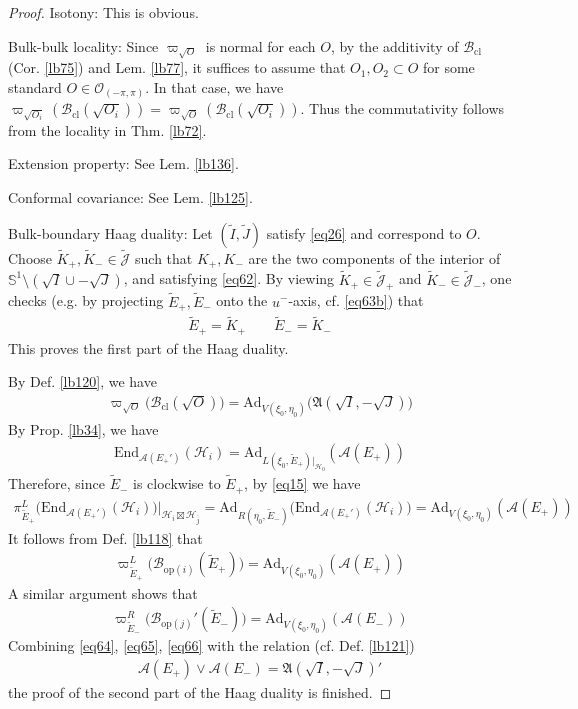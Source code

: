 \documentclass[11pt,b5paper,notitlepage]{article}
\theoremstyle{definition}
\theoremstyle{plain}
\newcommand{\fk}{\mathfrak}
\newcommand{\wtd}{\widetilde}
\newcommand{\ovl}{\overline}
\newcommand{\End}{\mathrm{End}} %
\newcommand{\Jtd}{\widetilde{\mathcal J}}
\newcommand{\Ad}{\mathrm{Ad}}
\newcommand{\Sbb}{{\mathbb S}}
\newcommand{\MA}{\mathcal A}
\newcommand{\MH}{\mathcal H}
\newcommand{\Bcl}{\mathcal B_{\mathrm{cl}}}
\newcommand{\Opp}{\mathcal O_{(-\pi,\pi)}}
\newcommand{\Bopi}{\mathcal B_{\mathrm{op}(i)}}
\newcommand{\Bopj}{\mathcal B_{\mathrm{op}(j)}}
\numberwithin{equation}{section}
\begin{document}
\begin{proof}
Isotony: This is obvious.

Bulk-bulk locality: Since $\varpi_{\sqrt O}$ is normal for each $O$, by the additivity of $\Bcl$ (Cor. \ref{lb75}) and Lem. \ref{lb77}, it suffices to assume that $O_1,O_2\subset O$ for some standard $O\in\Opp$. In that case, we have $\varpi_{\sqrt{O_i}}(\Bcl(\sqrt{O_i}))=\varpi_{\sqrt O}(\Bcl(\sqrt{O_i}))$. Thus the commutativity follows from the locality in Thm. \ref{lb72}.

Extension property: See Lem. \ref{lb136}.

Conformal covariance: See Lem. \ref{lb125}.

Bulk-boundary Haag duality: Let $(\wtd I,\wtd J)$ satisfy \eqref{eq26} and correspond to $O$. Choose $\wtd K_+,\wtd K_-\in\Jtd$ such that $K_+,K_-$ are the two components of the interior of $\Sbb^1\setminus(\sqrt I\cup-\sqrt J)$, and satisfying \eqref{eq62}. By viewing $\wtd K_+\in\Jtd_+$ and $\wtd K_-\in\Jtd_-$, one checks (e.g. by projecting $\wtd E_+,\wtd E_-$ onto the $u^-$-axis, cf. \eqref{eq63b}) that
\begin{align}\label{eq79}
\wtd E_+=\wtd K_+\qquad \wtd E_-=\wtd K_-
\end{align}
This proves the first part of the Haag duality.

By Def. \ref{lb120}, we have
\begin{align*}\label{eq64}
\varpi_{\sqrt O}\big(\Bcl(\sqrt O)\big)=\Ad_{V(\xi_0,\eta_0)}\big(\fk A(\sqrt I,-\sqrt J)\big)  \tag{a}
\end{align*}
By Prop. \ref{lb34}, we have
\begin{align*}
\End_{\MA(E_+')}(\MH_i)=\Ad_{L(\xi_0,\wtd E_+)|_{\MH_0}}(\MA(E_+))
\end{align*}
Therefore, since $\wtd E_-$ is clockwise to $\wtd E_+$, by \eqref{eq15} we have
\begin{align*}
\pi^L_{\wtd E_+}\big(\End_{\MA(E_+')}(\MH_i)\big)\big|_{\MH_i\boxtimes\MH_{\ovl j}}=\Ad_{R(\eta_0,\wtd E_-)}\big(\End_{\MA(E_+')}(\MH_i)\big)=\Ad_{V(\xi_0,\eta_0)}(\MA(E_+))
\end{align*}
It follows from Def. \ref{lb118} that
\begin{align*}\label{eq65}
\varpi^L_{\wtd E_+}\big(\Bopi(\wtd E_+)\big)=\Ad_{V(\xi_0,\eta_0)}(\MA(E_+))  \tag{b}
\end{align*}
A similar argument shows that
\begin{align*}\label{eq66}
\varpi^R_{\wtd E_-}\big(\Bopj'(\wtd E_-)\big)=\Ad_{V(\xi_0,\eta_0)}(\MA(E_-))  \tag{c}
\end{align*}
Combining \eqref{eq64}, \eqref{eq65}, \eqref{eq66} with the relation (cf. Def. \ref{lb121})
\begin{align*}
\MA(E_+)\vee\MA(E_-)=\fk A(\sqrt I,-\sqrt J)'
\end{align*} 
the proof of the second part of the Haag duality is finished.
\end{proof}
\end{document}
